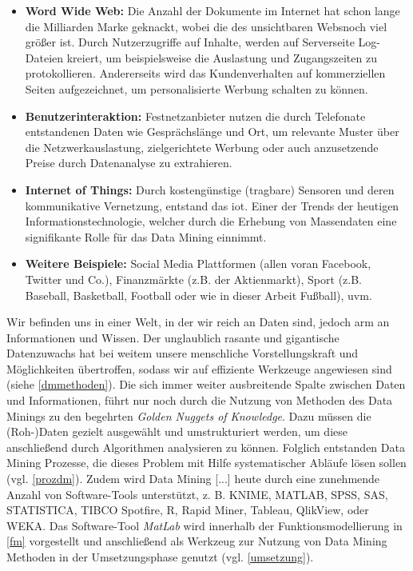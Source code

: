 \begin{itemize}
\item \textbf{Word Wide Web:} Die Anzahl der Dokumente im Internet hat schon lange die Milliarden Marke geknackt, wobei die des unsichtbaren \glqq Webs\grqq noch viel größer ist. Durch Nutzerzugriffe auf Inhalte, werden auf Serverseite Log-Dateien kreiert, um beispielsweise die Auslastung und Zugangszeiten zu protokollieren. Andererseits wird das Kundenverhalten auf kommerziellen Seiten aufgezeichnet, um personalisierte Werbung schalten zu können.

\item \textbf{Benutzerinteraktion:} Festnetzanbieter nutzen die durch Telefonate entstandenen Daten wie Gesprächslänge und Ort, um relevante Muster über die Netzwerkauslastung, zielgerichtete Werbung oder auch anzusetzende Preise durch Datenanalyse zu extrahieren.
\item \textbf{Internet of Things:} Durch kostengünstige (tragbare) Sensoren und deren kommunikative Vernetzung, entstand das \gls{iot}. Einer der Trends der heutigen Informationstechnologie, welcher durch die Erhebung von Massendaten eine signifikante Rolle für das Data Mining einnimmt.

\item \textbf{Weitere Beispiele:}  Social Media Plattformen (allen voran Facebook, Twitter und Co.), Finanzmärkte (z.B. der Aktienmarkt), Sport (z.B. Baseball, Basketball, Football oder wie in dieser Arbeit Fußball), uvm. 
\end{itemize}

Wir befinden uns in einer Welt, in der wir reich an Daten sind, jedoch arm an Informationen und Wissen. Der unglaublich rasante und gigantische Datenzuwachs hat bei weitem unsere menschliche Vorstellungskraft und Möglichkeiten übertroffen, sodass wir auf effiziente Werkzeuge angewiesen sind (siehe \vref{dmmethoden}). Die sich immer weiter ausbreitende Spalte zwischen Daten und Informationen, führt nur noch durch die Nutzung von Methoden des Data Minings zu den begehrten \glqq \textit{Golden Nuggets of Knowledge}\grqq. Dazu müssen die (Roh-)Daten gezielt ausgewählt und umstrukturiert werden, um diese anschließend durch Algorithmen analysieren zu können. Folglich entstanden Data Mining Prozesse, die dieses Problem mit Hilfe systematischer Abläufe lösen sollen (vgl. \vref{prozdm}). Zudem wird \glqq Data Mining [...] heute durch eine zunehmende Anzahl von Software-Tools unterstützt, z. B. KNIME, MATLAB, SPSS, SAS, STATISTICA, TIBCO Spotfire, R, Rapid Miner, Tableau, QlikView, oder WEKA.\grqq{} Das Software-Tool \textit{MatLab} wird innerhalb der Funktionsmodellierung in \vref{fm} vorgestellt und anschließend als Werkzeug zur Nutzung von Data Mining Methoden in der Umsetzungsphase genutzt (vgl. \vref{umsetzung}).


